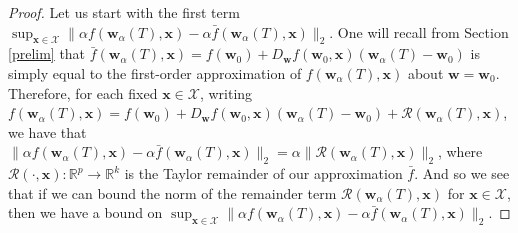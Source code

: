 \documentclass{article}
\begin{document}
\begin{proof}
Let us start with the first term $\sup_{\boldsymbol{x} \in \mathcal{X}} \| \alpha f(\boldsymbol{w}_{\alpha}(T), \boldsymbol{x}) - \alpha \bar{f}(\boldsymbol{w}_{\alpha}(T), \boldsymbol{x}) \|_2$. One will recall from Section \ref{prelim} that $\bar{f}(\boldsymbol{w}_{\alpha}(T), \boldsymbol{x}) = f(\boldsymbol{w}_0) + D_{\boldsymbol{w}}f(\boldsymbol{w}_0, \boldsymbol{x})(\boldsymbol{w}_{\alpha}(T) - \boldsymbol{w}_0)$ is simply equal to the first-order approximation of $f(\boldsymbol{w}_{\alpha}(T), \boldsymbol{x})$ about $\boldsymbol{w} = \boldsymbol{w}_0$. Therefore, for each fixed $\boldsymbol{x} \in \mathcal{X}$, writing $f(\boldsymbol{w}_{\alpha}(T), \boldsymbol{x}) = f(\boldsymbol{w}_0) + D_{\boldsymbol{w}}f(\boldsymbol{w}_0, \boldsymbol{x})(\boldsymbol{w}_{\alpha}(T) - \boldsymbol{w}_0) + \mathcal{R}(\boldsymbol{w}_{\alpha}(T), \boldsymbol{x})$, we have that $\| \alpha f(\boldsymbol{w}_{\alpha}(T), \boldsymbol{x}) - \alpha \bar{f}(\boldsymbol{w}_{\alpha}(T), \boldsymbol{x}) \|_2 = \alpha \|\mathcal{R}(\boldsymbol{w}_{\alpha}(T), \boldsymbol{x})\|_2$, where $\mathcal{R}(\cdot, \boldsymbol{x}): \mathbb{R}^p \rightarrow \mathbb{R}^k$ is the Taylor remainder of our approximation $\bar{f}$. And so we see that if we can bound the norm of the remainder term $\mathcal{R}(\boldsymbol{w}_{\alpha}(T), \boldsymbol{x})$ for $\boldsymbol{x} \in \mathcal{X}$, then we have a bound on $\sup_{\boldsymbol{x} \in \mathcal{X}} \| \alpha f(\boldsymbol{w}_{\alpha}(T), \boldsymbol{x}) - \alpha \bar{f}(\boldsymbol{w}_{\alpha}(T), \boldsymbol{x}) \|_2$.


\end{proof}
\end{document}
